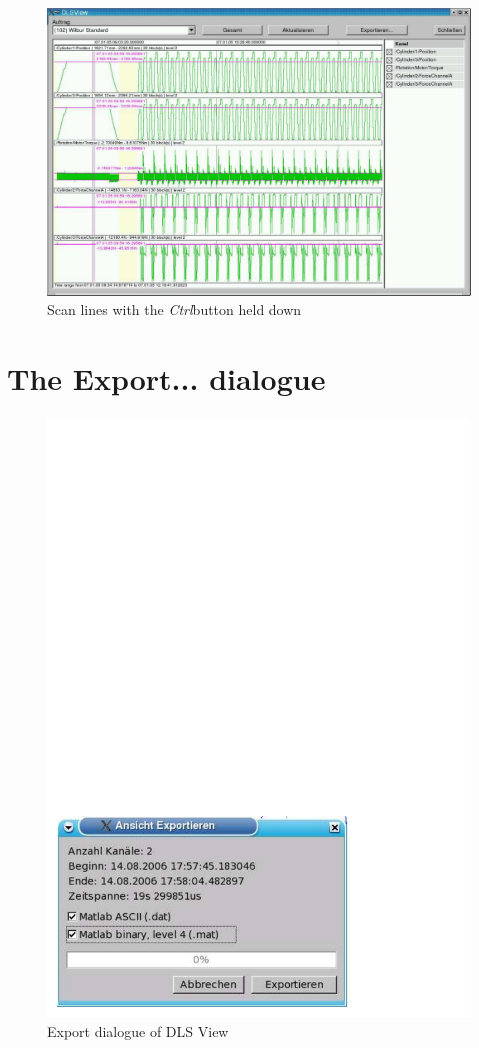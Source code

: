 \documentclass[a4paper,12pt,BCOR6mm,bibtotoc,idxtotoc]{scrbook}
\begin{document}
\begin{figure}[tbh] \begin{center} \includegraphics[width=\textwidth]{bilder/view_scan} \end{center} \caption{Scan lines with the \textit{Ctrl}button held down} \label{fig:dls_view_scan} \end{figure}


\section{The \glqq Export... dialogue\grqq} \label{sec:view_export}

\begin{figure}[tbh] \begin{center} \includegraphics[width=.6\textwidth]{bilder/view_export} \end{center} \caption{Export dialogue of DLS View} \label{fig:dls_view_export} \end{figure}
\end{document}
